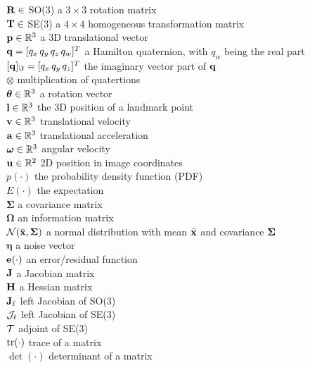 \noindent
$\mathbf{R} \in$ SO(3) \hfill a $3\times 3$ rotation matrix \\
$\mathbf{T} \in$ SE(3) \hfill a $4 \times 4$ homogeneous transformation matrix\\
$\mathbf{p} \in \mathbb{R}^3$ \hfill a 3D translational vector \\
$\mathbf{q}=[q_x \, q_y \, q_z \, q_w ]^T$ \hfill a Hamilton quaternion, with $q_w$ being the real part \\
$[\mathbf{q}]_\Im=[q_x\,q_y\,q_z]^T$ \hfill the imaginary vector part of $\mathbf{q}$\\
$\otimes$ \hfill multiplication of quatertions \\
$\bm\theta \in \mathbb{R}^3$ \hfill a rotation vector \\
$\mathbf{l} \in \mathbb{R}^3$ \hfill the 3D position of a landmark point \\
$\mathbf{v} \in \mathbb{R}^3$ \hfill  translational velocity \\
$\mathbf{a} \in \mathbb{R}^3$ \hfill  translational acceleration \\
$\bm\omega \in \mathbb{R}^3$ \hfill  angular velocity \\
${\bf u} \in \mathbb{R}^2$ \hfill 2D position in image coordinates \\
$p(\cdot)$ \hfill the probability density function (PDF) \\
$E(\cdot)$ \hfill  the expectation \\
$\bm\Sigma$ \hfill a covariance matrix \\
$\bm\Omega$ \hfill an information matrix \\
$\mathcal{N}(\bar{\mathbf{x}},\bm\Sigma)$ \hfill a normal distribution with mean $\bar{\mathbf{x}}$ and covariance $\bm\Sigma$ \\
${\bm\eta}$ \hfill a noise vector \\
${\bf e}(\cdot)$ \hfill an error/residual function \\
$\mathbf{J}$ \hfill a Jacobian matrix \\
$\mathbf{H}$ \hfill a Hessian matrix \\
$\mathbf{J}_\ell$ \hfill left Jacobian of SO(3) \\
$\mathcal{J}_\ell$ \hfill left Jacobian of SE(3) \\
$\mathcal{T}$ \hfill adjoint of SE(3)\\
$\mathrm{tr}(\cdot)$ \hfill trace of a matrix \\
$\det(\cdot)$ \hfill determinant of a matrix \\



